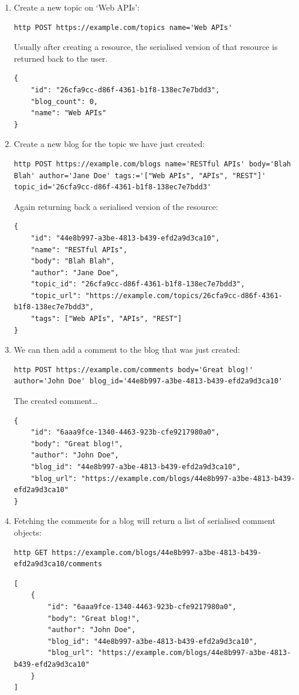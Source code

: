 \documentclass[]{full}
\theoremstyle{definition}
\begin{document}
\begin{enumerate}
    \item Create a new topic on `Web APIs':
    \begin{verbatim}
http POST https://example.com/topics name='Web APIs' 
    \end{verbatim}
    Usually after creating a resource, the serialised version of that resource is returned back to the user.
    \begin{verbatim}
{
    "id": "26cfa9cc-d86f-4361-b1f8-138ec7e7bdd3",
    "blog_count": 0,
    "name": "Web APIs"
}
    \end{verbatim}
    \item Create a new blog for the topic we have just created:
    \begin{verbatim}
http POST https://example.com/blogs name='RESTful APIs' body='Blah Blah' author='Jane Doe' tags:='["Web APIs", "APIs", "REST"]' topic_id='26cfa9cc-d86f-4361-b1f8-138ec7e7bdd3'
    \end{verbatim}
    Again returning back a serialised version of the resource:
    \begin{verbatim}
{
    "id": "44e8b997-a3be-4813-b439-efd2a9d3ca10",
    "name": "RESTful APIs",
    "body": "Blah Blah",
    "author": "Jane Doe",
    "topic_id": "26cfa9cc-d86f-4361-b1f8-138ec7e7bdd3",
    "topic_url": "https://example.com/topics/26cfa9cc-d86f-4361-b1f8-138ec7e7bdd3",
    "tags": ["Web APIs", "APIs", "REST"]
}
    \end{verbatim}
    \item We can then add a comment to the blog that was just created:
    \begin{verbatim}
http POST https://example.com/comments body='Great blog!' author='John Doe' blog_id='44e8b997-a3be-4813-b439-efd2a9d3ca10'
    \end{verbatim}
    The created comment\dots
    \begin{verbatim}
{
    "id": "6aaa9fce-1340-4463-923b-cfe9217980a0",
    "body": "Great blog!",
    "author": "John Doe",
    "blog_id": "44e8b997-a3be-4813-b439-efd2a9d3ca10",
    "blog_url": "https://example.com/blogs/44e8b997-a3be-4813-b439-efd2a9d3ca10"
}
    \end{verbatim}
    \item Fetching the comments for a blog will return a list of serialised comment objects:
    \begin{verbatim}
http GET https://example.com/blogs/44e8b997-a3be-4813-b439-efd2a9d3ca10/comments
    \end{verbatim}
    \begin{verbatim}
[
    {
        "id": "6aaa9fce-1340-4463-923b-cfe9217980a0",
        "body": "Great blog!",
        "author": "John Doe",
        "blog_id": "44e8b997-a3be-4813-b439-efd2a9d3ca10",
        "blog_url": "https://example.com/blogs/44e8b997-a3be-4813-b439-efd2a9d3ca10"
    }
]
    \end{verbatim}
\end{enumerate}
\end{document}
